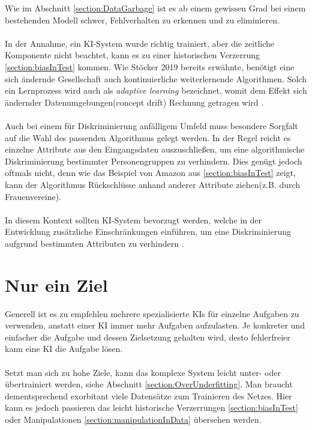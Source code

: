 \documentclass[12pt,oneside,a4paper,parskip]{scrbook}
\begin{document}
Wie im Abschnitt \ref{section:DataGarbage} ist es ab einem gewissen Grad bei einem bestehenden Modell schwer, Fehlverhalten zu erkennen und zu eliminieren.
\\\\
In der Annahme, ein KI-System wurde richtig trainiert, aber die zeitliche Komponente nicht beachtet, kann es zu einer historischen Verzerrung \ref{section:biasInTest} kommen.
Wie Stöcker 2019 \cite{stoecker} bereits erwähnte, benötigt eine sich ändernde Gesellschaft auch kontinuierliche weiterlernende Algorithmen. Solch ein Lernprozess wird auch als \textit{adaptive learning} bezeichnet, womit dem Effekt sich ändernder Datenumgebungen(concept drift) Rechnung getragen wird \cite{gama}.%
\\\\
Auch bei einem für Diskriminierung anfälligem Umfeld muss besondere Sorgfalt auf die Wahl des passenden Algorithmus gelegt werden. In der Regel reicht es einzelne Attribute aus den Eingangsdaten auszuschließen, um eine algorithmische Diskriminierung bestimmter Personengruppen zu verhindern. Dies genügt jedoch oftmals nicht, denn wie das Beispiel von Amazon aus \ref{section:biasInTest} zeigt, kann der Algorithmus Rückschlüsse anhand anderer Attribute ziehen(z.B. durch Frauenvereine).
\\\\
In diesem Kontext sollten KI-System bevorzugt werden, welche in der Entwicklung zusätzliche Einschränkungen einführen, um eine Diskriminierung aufgrund bestimmten Attributen zu verhindern \cite{kamiran}.

\section{Nur ein Ziel}
\label{section:oneGoal}

Generell ist es zu empfehlen mehrere spezialisierte KIs für einzelne Aufgaben zu verwenden, anstatt einer KI immer mehr Aufgaben aufzulasten. Je konkreter und einfacher die Aufgabe und dessen Zielsetzung gehalten wird, desto fehlerfreier kann eine KI die Aufgabe lösen.\\\\
Setzt man sich zu hohe Ziele, kann das komplexe System leicht unter- oder übertrainiert werden, siehe Abschnitt \ref{section:OverUnderfitting}. Man braucht dementsprechend exorbitant viele Datensätze zum Trainieren des Netzes. Hier kann es jedoch passieren das leicht historische Verzerrungen \ref{section:biasInTest} oder Manipulationen \ref{section:manipulationInData} übersehen werden.
\end{document}
